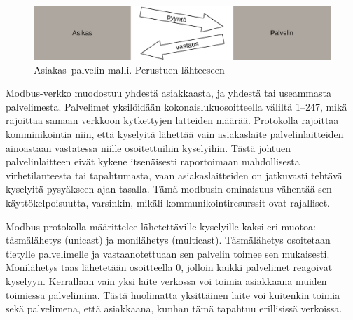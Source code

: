  \begin{figure}[h]
    \centering
    \includegraphics[width=1\textwidth]{figures/client_server}
    \caption[asiakas--palvelin-malli]{Asiakas--palvelin-malli.  Perustuen lähteeseen \parencite{modbusAppSpec}}
    \label{fig:c_s}
  \end{figure}

  Modbus-verkko muodostuu yhdestä asiakkaasta, ja yhdestä tai useammasta palvelimesta. Palvelimet yksilöidään kokonaislukuosoitteella väliltä 1--247, mikä rajoittaa samaan verkkoon kytkettyjen latteiden määrää.  Protokolla rajoittaa komminikointia niin, että kyselyitä lähettää vain asiakaslaite palvelinlaitteiden ainoastaan vastatessa niille osoitettuihin kyselyihin.\parencite{modbusSerialSpec} Tästä johtuen palvelinlaitteen eivät kykene itsenäisesti raportoimaan mahdollisesta virhetilanteesta tai tapahtumasta, vaan asiakaslaitteiden on jatkuvasti tehtävä kyselyitä pysyäkseen ajan tasalla. Tämä modbusin ominaisuus vähentää sen käyttökelpoisuutta, varsinkin, mikäli kommunikointiresurssit ovat rajalliset.

  Modbus-protokolla määrittelee lähetettäville kyselyille kaksi eri muotoa: täsmälähetys (unicast) ja monilähetys (multicast). Täsmälähetys osoitetaan tietylle palvelimelle ja vastaanotettuaan sen palvelin toimee sen mukaisesti. Monilähetys taas lähetetään osoitteella 0, jolloin kaikki palvelimet reagoivat kyselyyn.\parencite{modbusSerialSpec} Kerrallaan vain yksi laite verkossa voi toimia asiakkaana muiden toimiessa palvelimina. Tästä huolimatta yksittäinen laite voi kuitenkin toimia sekä palvelimena, että asiakkaana, kunhan tämä tapahtuu erillisissä verkoissa.\parencite{DincerRosen}

